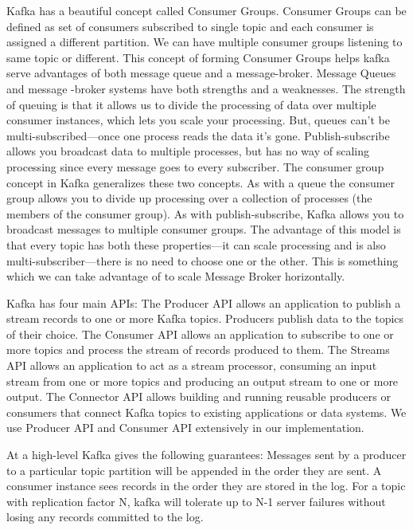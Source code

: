 \begin{itemize}
Kafka has a beautiful concept called Consumer Groups. Consumer Groups can be 
defined as set of consumers subscribed to single topic and each consumer is 
assigned a different partition. We can have multiple consumer groups listening 
to same topic or different. This concept of forming Consumer Groups helps kafka
serve advantages of both message queue and a message-broker. Message Queues and 
message -broker systems have both strengths and a weaknesses. The strength of
queuing is that it allows us to divide the processing of data over multiple
consumer instances, which lets you scale your processing. But, queues can't be
multi-subscribed—once one process reads the data it's gone. Publish-subscribe 
allows you broadcast data to multiple processes, but has no way of scaling 
processing since every message goes to every subscriber. The consumer group 
concept in Kafka generalizes these two concepts. As with a queue the consumer 
group allows you to divide up processing over a collection of processes 
(the members of the consumer group). As with publish-subscribe,
Kafka allows you to broadcast messages to multiple consumer groups. The 
advantage of this model is that every topic has both these properties—it can 
scale processing and is also multi-subscriber—there is no need to choose one or
the other. This is something which we can take advantage of to scale Message 
Broker horizontally.


Kafka has four main APIs: The Producer API allows an application to publish a 
stream records to one or more Kafka topics. Producers publish data to the topics
of their choice. 
The Consumer API allows an application to subscribe to one
or more topics and process the stream of records produced to them. 
The Streams API allows an application to act as a stream processor, consuming an
input stream from one or more topics and producing an output stream to one or 
more output.
The Connector API allows building and running reusable producers or consumers 
that connect Kafka topics to existing applications or data systems. 
We use Producer API and Consumer API extensively in our implementation.

At a high-level Kafka gives the following guarantees: Messages sent by a 
producer to a particular topic partition will be appended in the order they are
sent. A consumer instance sees records in the order they are stored in the log. 
For a topic with replication factor N, kafka will tolerate up to N-1 server 
failures without losing any records committed to the log. 



\end{itemize}
